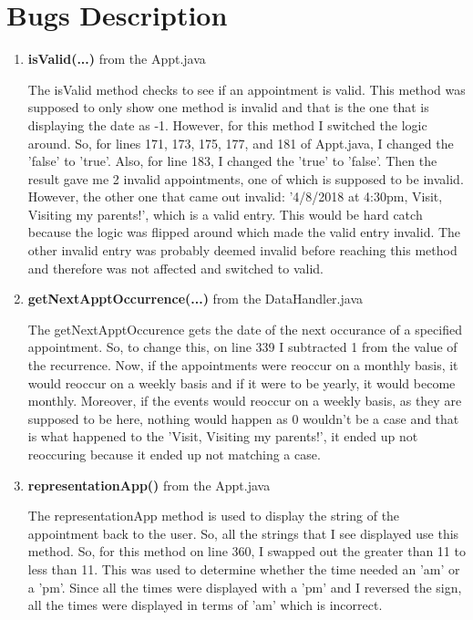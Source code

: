 \documentclass[12pt]{article}
\begin{document}
\section{Bugs Description}
\begin{enumerate}
\item \textbf{isValid(...)} from the Appt.java 
\begin{flushleft}
The isValid method checks to see if an appointment is valid. This method was supposed to only show one method is invalid and that is the one that is displaying the date as -1. However, for this method I switched the logic around. So, for lines 171, 173, 175, 177, and 181 of Appt.java, I changed the 'false' to 'true'. Also, for line 183, I changed the 'true' to 'false'. Then the result gave me 2 invalid appointments, one of which is supposed to be invalid. However, the other one that came out invalid: '4/8/2018 at 4:30pm, Visit, Visiting my parents!', which is a valid entry. This would be hard catch because the logic was flipped around which made the valid entry invalid. The other invalid entry was probably deemed invalid before reaching this method and therefore was not affected and switched to valid. 
\end{flushleft}


\item \textbf{getNextApptOccurrence(...)} from the DataHandler.java 
\begin{flushleft}
The getNextApptOccurence gets the date of the next occurance of a specified appointment. So, to change this, on line 339 I subtracted 1 from the value of the recurrence. Now, if the appointments were reoccur on a monthly basis, it would reoccur on a weekly basis and if it were to be yearly, it would become monthly. Moreover, if the events would reoccur on a weekly basis, as they are supposed to be here, nothing would happen as 0 wouldn't be a case and that is what happened to the 'Visit, Visiting my parents!', it ended up not reoccuring because it ended up not matching a case.  
\end{flushleft}

\item \textbf{representationApp()} from the Appt.java 
\begin{flushleft}
The representationApp method is used to display the string of the appointment back to the user. So, all the strings that I see displayed use this method. So, for this method on line 360, I swapped out the greater than 11 to less than 11. This was used to determine whether the time needed an 'am' or a 'pm'. Since all the times were displayed with a 'pm' and I reversed the sign, all the times were displayed in terms of 'am' which is incorrect.  
\end{flushleft}


\end{enumerate}
\end{document}
